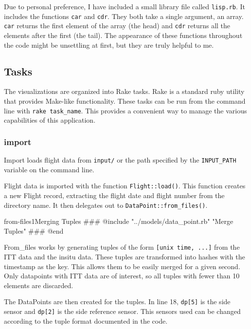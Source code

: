 \documentclass[12pt]{article}
\begin{document}
Due to personal preference, I have included a small library file called \texttt{lisp.rb}.  It includes the functions \texttt{car} and \texttt{cdr}.  They both take a single argument, an array.  \texttt{car} returns the first element of the array (the head) and \texttt{cdr} returns all the elements after the first (the tail).  The appearance of these functions throughout the code might be unsettling at first, but they are truly helpful to me.

\subsection*{Tasks}

The visualizations are organized into Rake tasks.  Rake is a standard ruby utility that provides Make-like functionality.  These tasks can be run from the command line with \texttt{rake task\_name}.  This provides a convenient way to manage the various capabilities of this application.

\subsubsection*{import}

Import loads flight data from \texttt{input/} or the path specified by the \texttt{INPUT\_PATH} variable on the command line.  

Flight data is imported with the function \texttt{Flight::load()}. This function creates a new Flight record, extracting the flight date and flight number from the directory name.  It then delegates out to \texttt{DataPoint::from\_files()}.

\begin{code}{from-files1}{Merging Tuples}
### @include "../models/data_point.rb" "Merge Tuples"
### @end
\end{code}

From\_files works by generating tuples of the form \texttt{[unix time, ...]} from the ITT data and the insitu data. These tuples are transformed into hashes with the timestamp as the key.  This allows them to be easily merged for a given second.  Only datapoints with ITT data are of interest, so all tuples with fewer than 10 elements are discarded.

The DataPoints are then created for the tuples.  In line 18, \texttt{dp[5]} is the side sensor and \texttt{dp[2]} is the side reference sensor.  This sensors used can be changed according to the tuple format documented in the code. 
\end{document}
